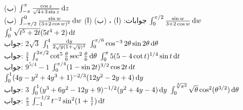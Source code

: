 (ب) \quad
$\int_{-\pi}^{\pi}\tfrac{\cos z}{\sqrt{4+3\sin z}}\dif z$\\
جوابات:\quad
(ا) ، (ب) 
(ا)\quad
$\int_{-\pi/2}^0\tfrac{\sin w}{(3+2\cos w)^2}\dif w$\quad
(ب) \quad
$\int_0^{\pi/2}\tfrac{\sin w}{3+2\cos w}\dif w$
$\int_0^1\sqrt{t^5+2t}(5t^4+2)\dif t$\\
جواب:\quad
$2\sqrt{3}$
$\int_1^4\tfrac{\dif y}{2\sqrt{y}(1+\sqrt{y})^2}$
$\int_0^{\pi/6}\cos^{-3}2\theta\sin2\theta\dif\theta$\\
جواب:\quad
$\tfrac{3}{4}$
$\int_{\pi}^{3\pi/2}\cot^5\tfrac{\theta}{6}\sec^2\tfrac{\theta}{6}\dif\theta$
$\int_0^{\pi}5(5-4\cot t)^{1/4}\sin t\dif t$\\
جواب:\quad
$9^{5/4}-1$
$\int_0^{\pi/4}(1-\sin 2t)^{3/2}\cos 2t\dif t$
$\int_0^1(4y-y^2+4y^3+1)^{-2/3}(12y^2-2y+4)\dif y$\\
جواب:\quad
$3$
$\int_0^1(y^3+6y^2-12y+9)^{-1/2}(y^2+4y-4)\dif y$
$\int_0^{\sqrt[3]{\pi^2}}\sqrt{\theta}\cos^2(\theta^{3/2})\dif\theta$\\
جواب:\quad
$\tfrac{\pi}{3}$
$\int_{-1}^{-1/2}t^{-2}\sin^2(1+\tfrac{1}{t})\dif t$
